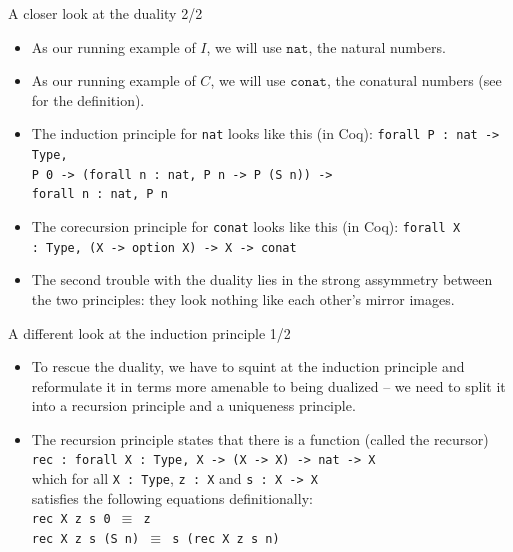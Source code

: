 \documentclass{beamer}
\begin{document}
\begin{frame}{A closer look at the duality 2/2}
\begin{itemize}
  \item As our running example of $I$, we will use $\texttt{nat}$, the natural numbers.
  \item As our running example of $C$, we will use $\texttt{conat}$, the conatural numbers (see \href{https://github.com/wkolowski/Seminar-Bisimulation-and-Coinduction/blob/master/src/Duality.v}{\color{blue}{here}} for the definition).
  \item The induction principle for \texttt{nat} looks like this (in Coq): \texttt{forall P :\ nat -> Type, \\ P 0 -> (forall n :\ nat, P n -> P (S n)) -> \\ forall n :\ nat, P n}
  \item The corecursion principle for \texttt{conat} looks like this (in Coq): \texttt{forall X :\ Type, (X -> option X) -> X -> conat}
  \item The second trouble with the duality lies in the strong assymmetry between the two principles: they look nothing like each other's mirror images.
\end{itemize}
\end{frame}

\begin{frame}{A different look at the induction principle 1/2}
\begin{itemize}
	\item To rescue the duality, we have to squint at the induction principle and reformulate it in terms more amenable to being dualized -- we need to split it into a recursion principle and a uniqueness principle.
	\item The recursion principle states that there is a function (called the recursor) \\
	\texttt{rec :\ forall X :\ Type, X -> (X -> X) -> nat -> X} \\
  which for all \texttt{X :\ Type}, \texttt{z :\ X} and \texttt{s :\ X -> X} \\
  satisfies the following equations definitionally: \\
	\texttt{rec X z s 0 $\equiv$ z} \\
	\texttt{rec X z s (S n) $\equiv$ s (rec X z s n)} \\
\end{itemize}
\end{frame}
\end{document}
